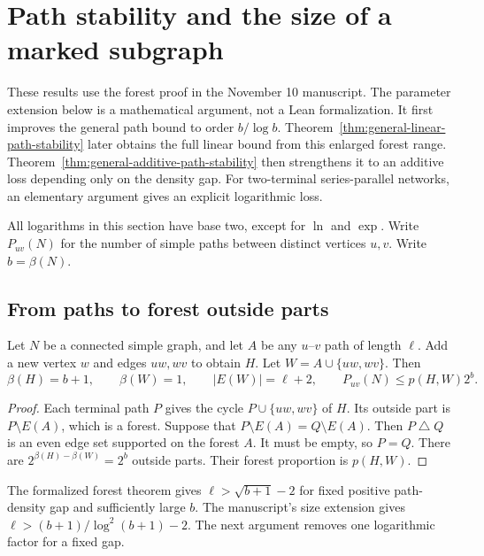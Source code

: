 \section{Path stability and the size of a marked subgraph}
\label{sec:research-path}

These results use the forest proof in the November 10 manuscript.
The parameter extension below is a mathematical argument, not a Lean formalization.
It first improves the general path bound to order $b/\log b$.
Theorem~\ref{thm:general-linear-path-stability} later obtains the full linear bound from this enlarged forest range.
Theorem~\ref{thm:general-additive-path-stability} then strengthens it to an additive loss depending only on the density gap.
For two-terminal series-parallel networks, an elementary argument gives an explicit logarithmic loss.

All logarithms in this section have base two, except for $\ln$ and $\exp$.
Write $P_{uv}(N)$ for the number of simple paths between distinct vertices $u,v$.
Write $b=\beta(N)$.

\subsection{From paths to forest outside parts}

\begin{lemma}\label{lem:research-path-injection}
Let $N$ be a connected simple graph, and let $A$ be any $u$--$v$ path of length $\ell$.
Add a new vertex $w$ and edges $uw,wv$ to obtain $H$.
Let $W=A\cup\{uw,wv\}$.
Then
\[
 \beta(H)=b+1,\qquad \beta(W)=1,\qquad |E(W)|=\ell+2,
 \qquad P_{uv}(N)\le p(H,W)2^b.
\]
\end{lemma}

\begin{proof}
Each terminal path $P$ gives the cycle $P\cup\{uw,wv\}$ of $H$.
Its outside part is $P\setminus E(A)$, which is a forest.
Suppose that $P\setminus E(A)=Q\setminus E(A)$.
Then $P\mathbin\triangle Q$ is an even edge set supported on the forest $A$.
It must be empty, so $P=Q$.
There are $2^{\beta(H)-\beta(W)}=2^b$ outside parts.
Their forest proportion is $p(H,W)$.
\end{proof}

The formalized forest theorem gives $\ell>\sqrt{b+1}-2$ for fixed positive path-density gap and sufficiently large $b$.
The manuscript's size extension gives $\ell>(b+1)/\log^2(b+1)-2$.
The next argument removes one logarithmic factor for a fixed gap.

